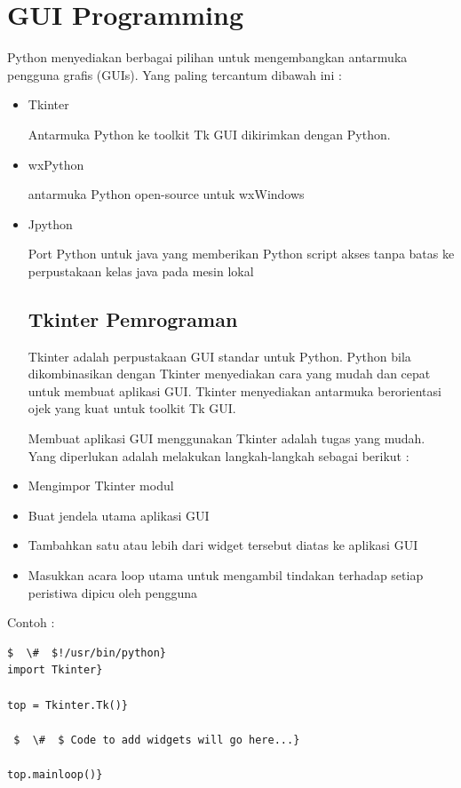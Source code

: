 \section{GUI Programming}
\hspace*{0.5in} Python menyediakan berbagai pilihan untuk mengembangkan antarmuka pengguna grafis (GUIs). Yang paling tercantum dibawah ini : 

\begin{itemize}
\item Tkinter 

Antarmuka Python ke toolkit Tk GUI dikirimkan dengan Python.  
\item wxPython 

antarmuka Python open-source untuk wxWindows 
 
\item Jpython 

Port Python untuk java yang memberikan Python script akses tanpa batas ke perpustakaan kelas java pada mesin lokal 

\subsection{Tkinter Pemrograman} 
\hspace*{0.5in} Tkinter adalah perpustakaan GUI standar untuk Python. Python bila dikombinasikan dengan Tkinter menyediakan cara yang mudah dan cepat untuk membuat aplikasi GUI. Tkinter menyediakan antarmuka berorientasi ojek yang kuat untuk toolkit Tk GUI. 
 
\hspace*{0.5in} Membuat aplikasi GUI menggunakan Tkinter adalah tugas yang mudah. Yang diperlukan adalah melakukan langkah-langkah sebagai berikut : 
 
\item Mengimpor Tkinter modul 
\item Buat jendela utama aplikasi GUI 
\item Tambahkan satu atau lebih dari widget tersebut diatas ke aplikasi GUI 
\item Masukkan acara loop utama untuk mengambil tindakan terhadap setiap peristiwa dipicu oleh pengguna\end{itemize}
 
\vspace{12pt} 
Contoh : 
\begin{verbatim}
$  \#  $!/usr/bin/python} 
import Tkinter} 

top = Tkinter.Tk()} 

 $  \#  $ Code to add widgets will go here...} 

top.mainloop()} 
\end{verbatim}

